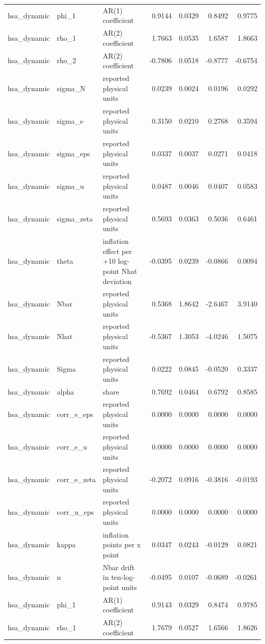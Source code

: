 \begin{tabular}{lllrrrr}
hsa\_dynamic & phi\_1 & AR(1) coefficient & 0.9144 & 0.0329 & 0.8492 & 0.9775 \\
hsa\_dynamic & rho\_1 & AR(2) coefficient & 1.7663 & 0.0535 & 1.6587 & 1.8663 \\
hsa\_dynamic & rho\_2 & AR(2) coefficient & -0.7806 & 0.0518 & -0.8777 & -0.6754 \\
hsa\_dynamic & sigma\_N & reported physical units & 0.0239 & 0.0024 & 0.0196 & 0.0292 \\
hsa\_dynamic & sigma\_e & reported physical units & 0.3150 & 0.0210 & 0.2768 & 0.3594 \\
hsa\_dynamic & sigma\_eps & reported physical units & 0.0337 & 0.0037 & 0.0271 & 0.0418 \\
hsa\_dynamic & sigma\_u & reported physical units & 0.0487 & 0.0046 & 0.0407 & 0.0583 \\
hsa\_dynamic & sigma\_zeta & reported physical units & 0.5693 & 0.0363 & 0.5036 & 0.6461 \\
hsa\_dynamic & theta & inflation effect per +10 log-point Nhat deviation & -0.0395 & 0.0239 & -0.0866 & 0.0094 \\
hsa\_dynamic & Nbar & reported physical units & 0.5368 & 1.8642 & -2.6467 & 3.9140 \\
hsa\_dynamic & Nhat & reported physical units & -0.5367 & 1.3053 & -4.0246 & 1.5075 \\
hsa\_dynamic & Sigma & reported physical units & 0.0222 & 0.0845 & -0.0520 & 0.3337 \\
hsa\_dynamic & alpha & share & 0.7692 & 0.0464 & 0.6792 & 0.8585 \\
hsa\_dynamic & corr\_e\_eps & reported physical units & 0.0000 & 0.0000 & 0.0000 & 0.0000 \\
hsa\_dynamic & corr\_e\_u & reported physical units & 0.0000 & 0.0000 & 0.0000 & 0.0000 \\
hsa\_dynamic & corr\_e\_zeta & reported physical units & -0.2072 & 0.0916 & -0.3816 & -0.0193 \\
hsa\_dynamic & corr\_u\_eps & reported physical units & 0.0000 & 0.0000 & 0.0000 & 0.0000 \\
hsa\_dynamic & kappa & inflation points per x point & 0.0347 & 0.0243 & -0.0129 & 0.0821 \\
hsa\_dynamic & n & Nbar drift in ten-log-point units & -0.0495 & 0.0107 & -0.0689 & -0.0261 \\
hsa\_dynamic & phi\_1 & AR(1) coefficient & 0.9143 & 0.0329 & 0.8474 & 0.9785 \\
hsa\_dynamic & rho\_1 & AR(2) coefficient & 1.7679 & 0.0527 & 1.6566 & 1.8626 \\

\end{tabular}
